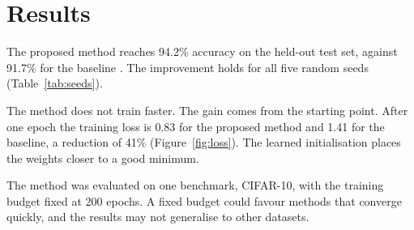 \section{Results}

The proposed method reaches 94.2\% accuracy on the held-out test set, against 91.7\% for the baseline \cite{smith2020}. The improvement holds for all five random seeds (Table~\ref{tab:seeds}).

The method does not train faster. The gain comes from the starting point. After one epoch the training loss is 0.83 for the proposed method and 1.41 for the baseline, a reduction of 41\% (Figure~\ref{fig:loss}). The learned initialisation places the weights closer to a good minimum.

The method was evaluated on one benchmark, CIFAR-10, with the training budget fixed at 200 epochs. A fixed budget could favour methods that converge quickly, and the results may not generalise to other datasets.

